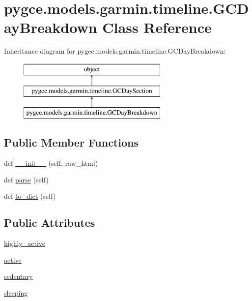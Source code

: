 \hypertarget{classpygce_1_1models_1_1garmin_1_1timeline_1_1_g_c_day_breakdown}{}\section{pygce.\+models.\+garmin.\+timeline.\+G\+C\+Day\+Breakdown Class Reference}
\label{classpygce_1_1models_1_1garmin_1_1timeline_1_1_g_c_day_breakdown}
Inheritance diagram for pygce.\+models.\+garmin.\+timeline.\+G\+C\+Day\+Breakdown\+:\begin{figure}[H]
\begin{center}
\leavevmode
\includegraphics[height=3.000000cm]{classpygce_1_1models_1_1garmin_1_1timeline_1_1_g_c_day_breakdown}
\end{center}
\end{figure}
\subsection*{Public Member Functions}
\begin{DoxyCompactItemize}
\item 
def \hyperlink{classpygce_1_1models_1_1garmin_1_1timeline_1_1_g_c_day_breakdown_af19f3c3dad89dff7f543be029b0778f7}{\+\_\+\+\_\+init\+\_\+\+\_\+} (self, raw\+\_\+html)
\item 
def \hyperlink{classpygce_1_1models_1_1garmin_1_1timeline_1_1_g_c_day_breakdown_aac05cc21c76e377ad50dcfcaca3a54da}{parse} (self)
\item 
def \hyperlink{classpygce_1_1models_1_1garmin_1_1timeline_1_1_g_c_day_breakdown_a517a2e5b269e95331fb51f531a5b9e4b}{to\+\_\+dict} (self)
\end{DoxyCompactItemize}
\subsection*{Public Attributes}
\begin{DoxyCompactItemize}
\item 
\hyperlink{classpygce_1_1models_1_1garmin_1_1timeline_1_1_g_c_day_breakdown_a736edad716e1770862ceac10f2d262e3}{highly\+\_\+active}
\item 
\hyperlink{classpygce_1_1models_1_1garmin_1_1timeline_1_1_g_c_day_breakdown_afabd12a8a6d22c156f9495483e4419b6}{active}
\item 
\hyperlink{classpygce_1_1models_1_1garmin_1_1timeline_1_1_g_c_day_breakdown_a03d898e7c3c8131ff30e0316d7257739}{sedentary}
\item 
\hyperlink{classpygce_1_1models_1_1garmin_1_1timeline_1_1_g_c_day_breakdown_a26a3f7d4d5903c8ad6221c11ded6d601}{sleeping}
\end{DoxyCompactItemize}


